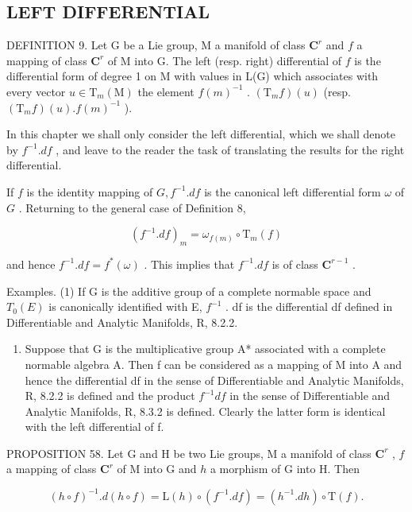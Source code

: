 \subsection{LEFT DIFFERENTIAL}

DEFINITION 9. Let G be a Lie group, M a manifold of class \(\mathbf{C}^r\) and \(f\) a mapping of class \(\mathbf{C}^r\) of M into G. The left (resp. right) differential of \(f\) is the differential form of degree 1 on M with values in L(G) which associates with every vector \(u \in \mathrm{T}_m(\mathrm{M})\) the element \(f(m)^{-1}\) . \((\mathrm{T}_m f)(u)\) (resp. \((\mathrm{T}_m f)(u). f(m)^{-1}\) ).

In this chapter we shall only consider the left differential, which we shall denote by \(f^{-1}.df\) , and leave to the reader the task of translating the results for the right differential.

If \(f\) is the identity mapping of \(G, f^{-1}.df\) is the canonical left differential form \(\omega\) of \(G\) . Returning to the general case of Definition 8,

\[
(f ^ {- 1}. d f) _ {m} = \omega_ {f (m)} \circ \mathrm{T} _ {m} (f)
\]

and hence \(f^{-1}.df = f^{*}(\omega)\) . This implies that \(f^{-1}.df\) is of class \(\mathbf{C}^{r - 1}\) .

Examples. (1) If G is the additive group of a complete normable space and \(T_{0}(E)\) is canonically identified with E, \(f^{-1}\) . df is the differential df defined in Differentiable and Analytic Manifolds, R, 8.2.2.

\begin{enumerate}
\def\labelenumi{(\arabic{enumi})}
\setcounter{enumi}{1}
\tightlist
\item
  Suppose that G is the multiplicative group A* associated with a complete normable algebra A. Then f can be considered as a mapping of M into A and hence the differential df in the sense of Differentiable and Analytic Manifolds, R, 8.2.2 is defined and the product \(f^{-1}df\) in the sense of Differentiable and Analytic Manifolds, R, 8.3.2 is defined. Clearly the latter form is identical with the left differential of f.
\end{enumerate}

PROPOSITION 58. Let G and H be two Lie groups, M a manifold of class \(\mathbf{C}^r\) , \(f\) a mapping of class \(\mathbf{C}^r\) of M into G and \(h\) a morphism of G into H. Then

\[
(h \circ f) ^ {- 1}. d (h \circ f) = \mathrm{L} (h) \circ (f ^ {- 1}. d f) = (h ^ {- 1}. d h) \circ \mathrm{T} (f).
\]

